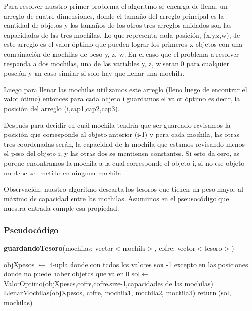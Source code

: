 \documentclass[spanish,12pt]{article}
\begin{document}
{	Para resolver nuestro primer problema el algoritmo se encarga de llenar un arreglo de cuatro dimensiones, donde el tamaño del arreglo principal es la cantidad de objetos y los tamaños de los otros tres arreglos anidados son las capacidades de las tres mochilas.
	Lo que representa cada posición, (x,y,z,w), de este arreglo es el valor óptimo que pueden lograr los primeros x objetos con una combinación de mochilas de peso y, z, w. En el caso que el problema a resolver responda a dos mochilas, una de las variables y, z, w seran 0 para cualquier posción y un caso similar si solo hay que llenar una mochila.


	Luego para llenar las mochilas utilizamos este arreglo (lleno luego de encontrar el valor ótimo) entonces para cada objeto i guardamos el valor óptimo es decir, la posición del arreglo (i,cap1,cap2,cap3).

	Después para decidir en cuál mochila tendría que ser guardado revisamos la posición que corresponde al objeto anterior (i-1) y para cada mochila, las otras tres coordenadas serán, la capacidad de la mochila que estamos revisando menos el peso del objeto i, y las otras dos se mantienen constantes. Si esto da cero, es porque encontramos la mochila a la cual corresponde el objeto i, si no ese objeto no debe ser metido en ninguna mochila.


	Observación: nuestro algoritmo descarta los tesoros que tienen un peso mayor al máximo de capacidad entre las mochilas. Asumimos en el pseusocódigo que nuestra entrada cumple esa propiedad.


\subsubsection{Pseudocódigo}

\begin{algorithm}[H]{\textbf{guardandoTesoro}(mochilas: vector$<$mochila$>$, cofre: vector$<$tesoro$>$)}
	\begin{algorithmic}[1]
		\State objXpesos $\gets$ 4-upla donde con todos los valores son -1 excepto en las posiciones donde no puede haber objetos que valen  0 %
		\State sol$\gets$ ValorOptimo(objXpesos,cofre,cofre.size-1,capacidades de las mochilas)
		\State LlenarMochilas(objXpesos, cofre, mochila1, mochila2, mochila3)
		\State return (sol, mochilas)
	\end{algorithmic}
\end{algorithm}



}
\end{document}

